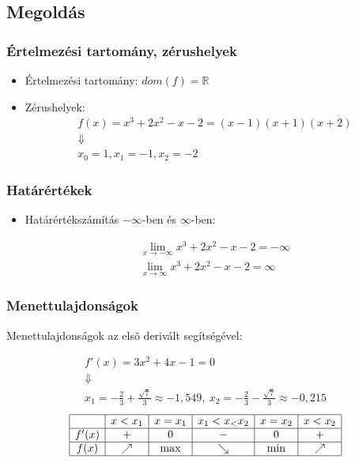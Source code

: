 \documentclass[ignorenonframetext]{beamer}
\begin{document}
\subsection{Megoldás}
\begin{frame}[fragile]
    \frametitle{Értelmezési tartomány, zérushelyek}
    \begin{itemize}
        \item Értelmezési tartomány:
              $dom(f)=\mathbb{R}$
        \item Zérushelyek:
              \begin{gather*}
                  f(x)=x^3+2x^2-x-2=(x-1)(x+1)(x+2) \\
                  \Downarrow                        \\
                  x_0=1,x_1=-1,x_2=-2
              \end{gather*}
    \end{itemize}
\end{frame}
\begin{frame}[fragile]
    \frametitle{Határértékek}
    \begin{itemize}
        \item Határértékszámítás $-\infty$-ben és $\infty$-ben:

              \begin{gather*}
                  \lim\limits_{x \to -\infty} x^3+2x^2-x-2=-\infty\\
                  \lim\limits_{x \to \infty} x^3+2x^2-x-2=\infty
              \end{gather*}
    \end{itemize}


\end{frame}
\begin{frame}[fragile]
    \frametitle{Menettulajdonságok}
    Menettulajdonságok az elsõ derivált segítségével:

    \begin{gather*}
        f'(x)=3x^2+4x-1=0\\
        \Downarrow\\
        x_1=-\frac{2}{3}+\frac{\sqrt{7}}{3}\approx-1,549,
        \ x_2=-\frac{2}{3}-\frac{\sqrt{7}}{3}\approx-0,215
    \end{gather*}
    \[
        \begin{array}{|c|c|c|c|c|c|}
            \hline
                  & x<x_1    & x=x_1 & x_1<x_<x_2 & x=x_2 & x<x_2    \\
            \hline
            f'(x) & +        & 0     & -          & 0     & +        \\
            \hline
            f(x)  & \nearrow & \max  & \searrow   & \min  & \nearrow \\
            \hline
        \end{array}
    \]
\end{frame}
\end{document}
